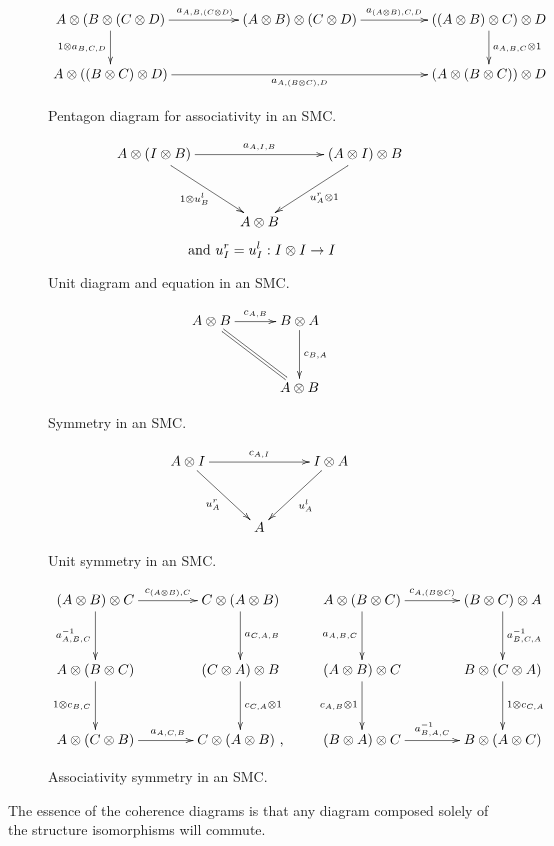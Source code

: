 \begin{figure}[!htbp]
\[
  \xymatrix@C+25pt{
    A\*(B\*(C\*D) \ar[r]^{a_{A,B,(C\*D)}} \ar[d]_{1\*a_{B,C,D}}
      & (A\*B)\*(C\*D) \ar[r]^{a_{(A\*B),C,D}}
      & ((A\*B)\*C)\*D \ar[d]^{a_{A,B,C}\*1}\\
    A\*((B\*C)\*D) \ar[rr]_{a_{A,(B\*C),D}}
      && (A\*(B\*C))\*D
  }
\]
\caption{Pentagon diagram for associativity in an SMC.}\label{fig:SMC_pentagon}
\end{figure}
\begin{figure}[!htbp]
\[
  \xymatrix@C+5pt@R+10pt{
    A\*(I\*B) \ar[rr]^{a_{A,I,B}} \ar[dr]_{1\*u^l_B}
      && (A\*I)\*B \ar[dl]^{u^r_A \* 1}\\
      &A\*B
  }
\]
\[\text{ and } u^r_I = u^l_I: I\otimes I \to I\]
\caption{Unit diagram and equation in an SMC.}\label{fig:SMC_unit}
\end{figure}
\begin{figure}[!htbp]
\[
  \xymatrix@C+5pt@R+10pt{
    A\*B \ar[r]^{c_{A,B}} \ar@{=}[dr]
      & B\*A \ar[d]^{c_{B,A}}\\
      &A\*B
  }
\]
\caption{Symmetry in an SMC.}\label{fig:SMC_commutes}
\end{figure}
\begin{figure}[!htbp]
\[
  \xymatrix@C+5pt@R+10pt{
    A\*I \ar[rr]^{c_{A,I}} \ar[dr]_{u^r_A}
      && I\*A \ar[dl]^{u^l_A}\\
      &A
  }
\]
\caption{Unit symmetry in an SMC.}\label{fig:SMC_unit_symmettry}
\end{figure}
\begin{figure}[!htbp]
\[
  \xymatrix@C+15pt@R+10pt{
    (A\*B)\*C \ar[r]^{c_{(A\*B),C}} \ar[d]_{a^{-1}_{A,B,C}}
      & C\*(A\*B) \ar[d]^{a_{C,A,B}}\\
    A\*(B\*C) \ar[d]_{1\*c_{B,C}}
      & (C\*A)\*B \ar[d]^{c_{C,A}\*1}\\
    A\*(C\*B) \ar[r]^{a_{A,C,B}}
      & C\*(A\*B)\text{ ,}
  }\qquad
  \xymatrix@C+15pt@R+10pt{
    A\*(B\*C) \ar[r]^{c_{A,(B\*C)}} \ar[d]_{a_{A,B,C}}
      & (B\*C)\*A \ar[d]^{a^{-1}_{B,C,A}}\\
    (A\*B)\*C \ar[d]_{c_{A,B}\*1}
      & B\*(C\*A) \ar[d]^{1\*c_{C,A}}\\
    (B\*A)\*C \ar[r]^{a^{-1}_{B,A,C}}
      & B\*(A\*C)
  }
\]
\caption{Associativity symmetry in an SMC.}\label{fig:SMC_associativity_symmetry}
\end{figure}
The essence of the coherence diagrams is that any diagram composed solely of the structure
isomorphisms will commute.

